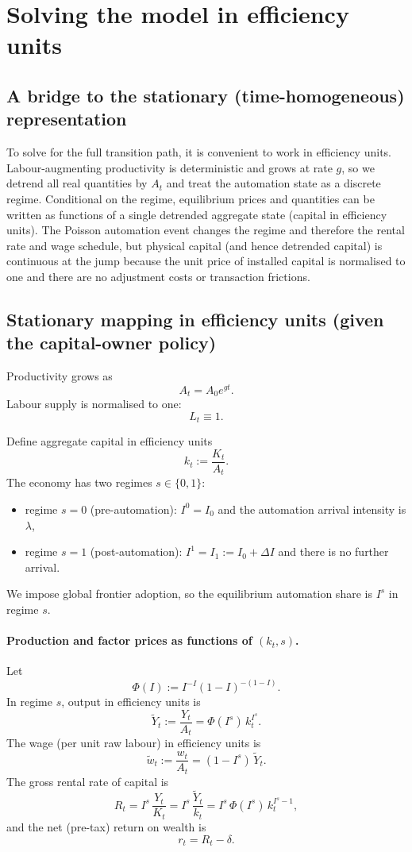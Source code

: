 \documentclass{article}
\begin{document}
\section{Solving the model in efficiency units}
\label{sec:solve_efficiency}

\subsection{A bridge to the stationary (time-homogeneous) representation}

To solve for the full transition path, it is convenient to work in efficiency units. Labour-augmenting productivity is deterministic and grows at rate $g$, so we detrend all real quantities by $A_t$ and treat the automation state as a discrete regime. Conditional on the regime, equilibrium prices and quantities can be written as functions of a single detrended aggregate state (capital in efficiency units). The Poisson automation event changes the regime and therefore the rental rate and wage schedule, but physical capital (and hence detrended capital) is continuous at the jump because the unit price of installed capital is normalised to one and there are no adjustment costs or transaction frictions.

\subsection{Stationary mapping in efficiency units (given the capital-owner policy)}

Productivity grows as
$$
A_t = A_0 e^{g t}.
$$
Labour supply is normalised to one:
$$
L_t \equiv 1.
$$

Define aggregate capital in efficiency units
$$
k_t := \frac{K_t}{A_t}.
$$
The economy has two regimes $s\in\{0,1\}$:
\begin{itemize}
\item regime $s=0$ (pre-automation): $I^0 = I_0$ and the automation arrival intensity is $\lambda$,
\item regime $s=1$ (post-automation): $I^1 = I_1 := I_0+\Delta I$ and there is no further arrival.
\end{itemize}
We impose global frontier adoption, so the equilibrium automation share is $I^s$ in regime $s$.

\paragraph{Production and factor prices as functions of $(k_t,s)$.}
Let
$$
\Phi(I) := I^{-I}(1-I)^{-(1-I)}.
$$
In regime $s$, output in efficiency units is
$$
\tilde Y_t := \frac{Y_t}{A_t} = \Phi(I^s)\,k_t^{I^s}.
$$
The wage (per unit raw labour) in efficiency units is
$$
\tilde w_t := \frac{w_t}{A_t} = (1-I^s)\,\tilde Y_t.
$$
The gross rental rate of capital is
$$
R_t = I^s\,\frac{Y_t}{K_t} = I^s\,\frac{\tilde Y_t}{k_t}
= I^s\,\Phi(I^s)\,k_t^{I^s-1},
$$
and the net (pre-tax) return on wealth is
$$
r_t = R_t - \delta.
$$
\end{document}
